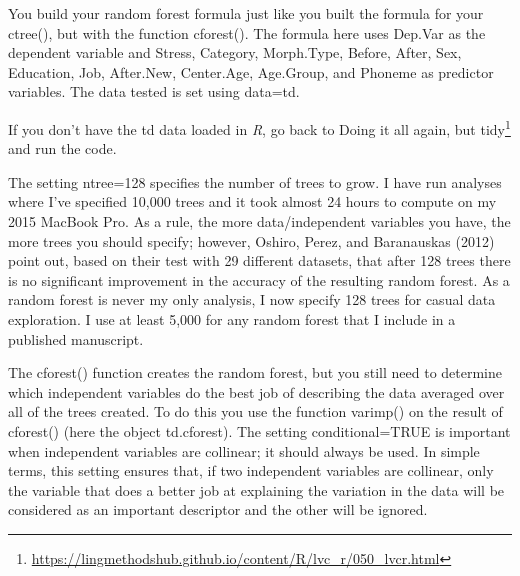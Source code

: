 \documentclass[
  10pt,
  letterpaper]{article}
\renewcommand\texttt[1]{{\ttfamily\color{BrickRed}#1}}
\DeclareRobustCommand{\href}[2]{#2\footnote{\url{#1}}}
\begin{document}
You build your random forest formula just like you built the formula for
your \texttt{ctree()}, but with the function \texttt{cforest()}. The
formula here uses \texttt{Dep.Var} as the dependent variable and
\texttt{Stress}, \texttt{Category}, \texttt{Morph.Type},
\texttt{Before}, \texttt{After}, \texttt{Sex}, \texttt{Education},
\texttt{Job}, \texttt{After.New}, \texttt{Center.Age},
\texttt{Age.Group}, and \texttt{Phoneme} as predictor variables. The
data tested is set using \texttt{data=td}.

\begin{tcolorbox}[enhanced jigsaw, rightrule=.15mm, left=2mm, toprule=.15mm, breakable, colback=white, colframe=quarto-callout-tip-color-frame, leftrule=.75mm, bottomtitle=1mm, title=\textcolor{quarto-callout-tip-color}{\faLightbulb}\hspace{0.5em}{Get the data first}, colbacktitle=quarto-callout-tip-color!10!white, coltitle=black, arc=.35mm, titlerule=0mm, bottomrule=.15mm, toptitle=1mm, opacityback=0, opacitybacktitle=0.6]

If you don't have the \texttt{td} data loaded in \emph{R}, go back to
\href{https://lingmethodshub.github.io/content/R/lvc_r/050_lvcr.html}{Doing
it all again, but \texttt{tidy}} and run the code.

\end{tcolorbox}

The setting \texttt{ntree=128} specifies the number of trees to grow. I
have run analyses where I've specified 10,000 trees and it took almost
24 hours to compute on my 2015 MacBook Pro. As a rule, the more
data/independent variables you have, the more trees you should specify;
however, Oshiro, Perez, and Baranauskas (2012) point out, based on their
test with 29 different datasets, that after 128 trees there is no
significant improvement in the accuracy of the resulting random forest.
As a random forest is never my only analysis, I now specify 128 trees
for casual data exploration. I use at least 5,000 for any random forest
that I include in a published manuscript.

The \texttt{cforest()} function creates the random forest, but you still
need to determine which independent variables do the best job of
describing the data averaged over all of the trees created. To do this
you use the function \texttt{varimp()} on the result of
\texttt{cforest()} (here the object \texttt{td.cforest}). The setting
\texttt{conditional=TRUE} is important when independent variables are
collinear; it should always be used. In simple terms, this setting
ensures that, if two independent variables are collinear, only the
variable that does a better job at explaining the variation in the data
will be considered as an important descriptor and the other will be
ignored.
\end{document}
